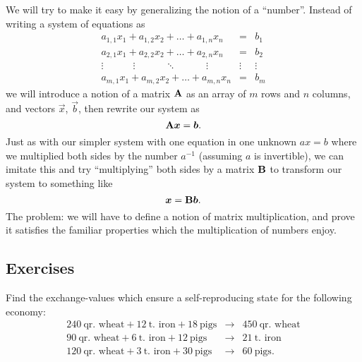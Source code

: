 We will try to make it easy by generalizing the notion of a
``number''. Instead of writing a system of equations as
\begin{equation}
\begin{array}{rcl}
a_{1,1}x_{1} + a_{1,2}x_{2} + \dots + a_{1,n}x_{n} &=& b_{1}\\
a_{2,1}x_{1} + a_{2,2}x_{2} + \dots + a_{2,n}x_{n} &=& b_{2}\\
\vdots\quad \qquad\vdots\quad\qquad\ddots\quad\qquad\vdots\quad & \vdots & \vdots\\
a_{m,1}x_{1} + a_{m,2}x_{2} + \dots + a_{m,n}x_{n} &=& b_{m}
\end{array}
\end{equation}
we will introduce a notion of a matrix $\mathbf{A}$ as an array of $m$ rows and
$n$ columns, and vectors $\vec{x}$, $\vec{b}$, then rewrite our system
as
\begin{equation}
\mathbf{A}\boldsymbol{x}=\boldsymbol{b}.
\end{equation}
Just as with our simpler system with one equation in one unknown $ax=b$
where we multiplied both sides by the number $a^{-1}$ (assuming $a$ is
invertible), we can imitate this and try ``multiplying'' both sides by a
matrix $\mathbf{B}$ to transform our system to something like
\begin{equation}
\boldsymbol{x} = \mathbf{B}\boldsymbol{b}.
\end{equation}
The problem: we will have to define a notion of matrix multiplication,
and prove it satisfies the familiar properties which the multiplication
of numbers enjoy.

\subsection*{Exercises}

\begin{exercise}
Find the exchange-values which ensure a
self-reproducing state for the following economy:
\begin{equation}
  \begin{array}{rcl}
240~\mbox{qr. wheat} + 12~\mbox{t. iron} + 18~\mbox{pigs} &\to& 450~\mbox{qr. wheat}\\
 90~\mbox{qr. wheat} +  6~\mbox{t. iron} + 12~\mbox{pigs} &\to& 21~\mbox{t. iron}\\
120~\mbox{qr. wheat} +  3~\mbox{t. iron} + 30~\mbox{pigs} &\to& 60~\mbox{pigs}.
  \end{array}
  \end{equation}
\end{exercise}

